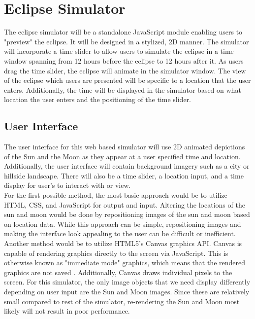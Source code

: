 \documentclass[10pt, onecolumn, draftclsnofoot, letterpaper, compsoc]{IEEEtran}
\begin{document}
\section{Eclipse Simulator}
The eclipse simulator will be a standalone JavaScript module enabling users to
"preview" the eclipse. It will be designed in a stylized, 2D manner.
The simulator will incorporate a time slider to allow users to simulate
the eclipse in a time window spanning from 12 hours before the eclipse to 12
hours after it. As users drag the time slider, the eclipse will animate in the
simulator window. The view of the eclipse which users are presented will be
specific to a location that the user enters. Additionally, the time will be
displayed in the simulator based on what location the user enters and the
positioning of the time slider. \\

\subsection{User Interface}

The user interface for this web based simulator will use 2D animated depictions
of the Sun and the Moon as they appear at a user specified time and location.
Additionally, the user interface will contain background imagery such as a
city or hillside landscape. There will also be a time slider, a location
input, and a time display for user's to interact with or view. \\

For the first possible method, the most basic approach would be to utilize
HTML, CSS, and JavaScript for output and input. Altering the locations of the
sun and moon would be done by repositioning images of the sun and moon based on
location data. While this approach can be simple, repositioning images and
making the interface look appealing to the user can be difficult or
inefficient. \\

Another method would be to utilize HTML5's Canvas graphics API. Canvas is
capable of rendering graphics directly to the screen via JavaScript. This is
otherwise known as "immediate mode" graphics, which means that the rendered
graphics are not saved \cite{SVGvsC}. Additionally, Canvas draws individual
pixels to the screen. For this simulator, the only image objects that we need
display differently depending on user input are the Sun and Moon images.
Since these are relatively small compared to rest of the simulator,
re-rendering the Sun and Moon most likely will not result in poor performance. \\
\end{document}
